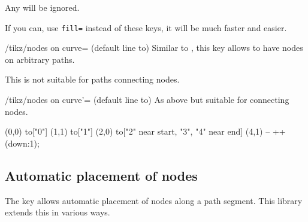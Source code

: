 \begin{multicols}{2}
Any  will be ignored.

If you can, use \texttt{fill=}
instead of these keys, it will be much faster and easier.

\begin{stylekey}{/tikz/nodes on curve= (default line to)}
Similar to , this key allows
to have nodes on arbitrary paths.

This is not suitable for paths connecting nodes.
\end{stylekey}

\begin{stylekey}{/tikz/nodes on curve'= (default line to)}
As above but suitable for connecting nodes.
\end{stylekey}

\begin{codeexample}[preamble=\usetikzlibrary{ext.nodes, intersections, quotes, spath3}]
\end{codeexample}
\begin{codeexample}[preamble=\usetikzlibrary{ext.nodes, intersections, quotes, spath3}]
\tikz[inner sep=.15em, circle, nodes={draw, green}, sloped, ultra thick]
  \draw[->, nodes on curve=bend left] (0,0) to["0"] (1,1)
                                            to["1"] (2,0)
              to["2" near start, "3", "4" near end] (4,1)
                                            -- ++(down:1);
\end{codeexample}

\subsection{Automatic placement of nodes}
The  key allows automatic placement of
nodes along a path segment.
This library extends this in various ways.


\end{multicols}
